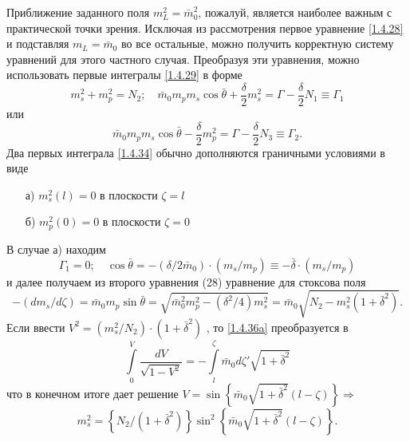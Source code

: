 \documentclass[a4paper]{article}
\begin{document}
Приближение заданного поля $m_{L}^{2}=\bar{m}_{0}^{2}$, пожалуй, является наиболее важным с практической точки зрения. Исключая из рассмотрения первое уравнение \eqref{1.4.28} и подставляя $m_{L}=\bar{m}_{0}$  во все остальные, можно получить корректную систему уравнений для этого частного случая. Преобразуя эти уравнения, можно использовать первые интегралы \eqref{1.4.29} в форме 
\begin{equation}
	m_{s}^{2}+m_{p}^{2}=N_{2};\quad \bar{m}_{0}m_{p}m_{s}\cos\bar{\theta}+\frac{\delta}{2}m_{s}^{2}=\Gamma-\frac{\delta}{2}N_{1}\equiv\Gamma_{1}
	\label{1.4.34}
\end{equation}
или 
\begin{equation}
	\bar{m}_{0}m_{p}m_{s}\cos\bar{\theta}-\frac{\delta}{2}m_{p}^{2}=\Gamma-\frac{\delta}{2}N_{3}\equiv\Gamma_{2}.
	\tag{34'}\label{1.4.34'}
\end{equation}
Два первых интеграла \eqref{1.4.34} обычно дополняются граничными условиями в виде
\begin{itemize}
	\item[а)]$m_{s}^{2}(l)=0$ в плоскости $\zeta=l$
\end{itemize}
\begin{itemize}
	\item[б)] $m_{p}^{2}(0)=0$ в плоскости $\zeta=0$
\end{itemize}
В случае а) находим 
\begin{equation}
	\Gamma_{1}=0;\quad\cos\bar{\theta}=-(\delta/2\bar{m}_{0})\cdot(m_{s}/m_{p})\equiv-\bar{\delta}\cdot(m_{s}/m_{p})
	\tag{35a}\label{1.4.35a}
\end{equation}
и далее получаем из второго уравнения (28) уравнение для стоксова поля 
\begin{equation}
	-(dm_{s}/d\zeta)=\bar{m}_{0}m_{p}\sin\bar{\theta}=\sqrt{\bar{m}_{0}^{2}m_{p}^{2}-(\delta^{2}/4)m_{s}^{2}}=\bar{m}_{0}\sqrt{N_{2}-m_{s}^{2}(1+\bar{\delta}^{2})}.
	\tag{36a}\label{1.4.36a}
\end{equation}
Если ввести $V^{2}=(m_{s}^{2}/N_{2})\cdot(1+\bar{\delta}^{2})$ , то \eqref{1.4.36a} преобразуется в 
$$\int\limits_{0}^{V}\frac{dV}{\sqrt{1-V^{2}}}=-\int\limits_{l}^{\zeta}\bar{m}_{0}d\zeta'\sqrt{1+\bar{\delta}^{2}}$$
что в конечном итоге дает решение $V=\sin\left\{\bar{m}_{0}\sqrt{1+\bar{\delta}^{2}}(l-\zeta)\right\}\Rightarrow$
\begin{equation}
	m_{s}^{2}=\left\{N_{2}/(1+\bar{\delta}^{2})\right\}\sin^{2}\left\{\bar{m}_{0}\sqrt{1+\bar{\delta}^{2}}(l-\zeta)\right\}.
	\tag{37a}\label{1.4.37a}
\end{equation} 
\end{document}
